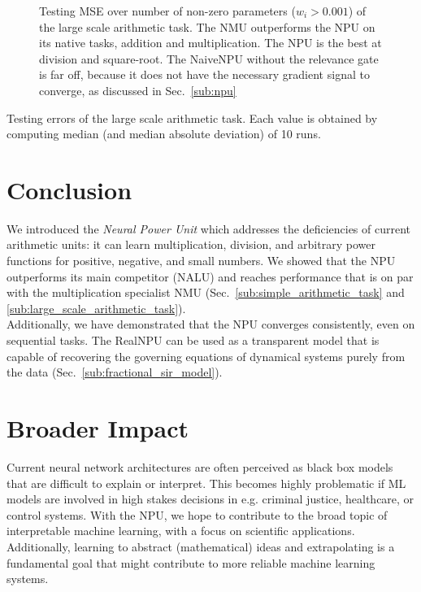 \documentclass[9pt]{article}
\begin{document}
\begin{figure}
  \centering
  \resizebox{\textwidth}{!}{}
  \caption{Testing MSE over number of non-zero parameters ($w_i > 0.001$) of the large scale
  arithmetic task. The NMU outperforms the NPU on its
  native tasks, addition and multiplication. The NPU is the best at division
  and square-root.  The NaiveNPU without the relevance gate is far off, because
  it does not have the necessary gradient signal to converge, as discussed in
  Sec.~\ref{sub:npu}}%
  \label{fig:pareto}
\end{figure}

\begin{table}
  \centering
  \caption{Testing errors of the large scale arithmetic task. Each value is
  obtained by computing median (and median absolute deviation) of 10 runs.}
  \label{tab:arithmetic100_val}
  \small
  
\end{table}

 
\section{Conclusion}%
\label{sec:conclusion}

We introduced the \emph{Neural Power Unit} which addresses the deficiencies
of current arithmetic units: it can learn multiplication, division, and arbitrary power functions for
positive, negative, and small numbers. We showed that the NPU outperforms its
main competitor (NALU) and reaches performance that is on par with the
multiplication specialist NMU (Sec.~\ref{sub:simple_arithmetic_task} and
\ref{sub:large_scale_arithmetic_task}).\\
Additionally, we have demonstrated that the NPU converges consistently, even on
sequential tasks. The RealNPU can be used as a transparent model that
is capable of recovering the governing equations of dynamical systems purely
from the data (Sec.~\ref{sub:fractional_sir_model}).

\section*{Broader Impact}%
\label{sec:statement_of_broader_impact}

Current neural network architectures are often perceived as black box models
that are difficult to explain or interpret. This becomes highly problematic if
ML models are involved in high stakes decisions in e.g. criminal justice,
healthcare, or control systems.  With the NPU, we hope to contribute to the
broad topic of interpretable machine learning, with a focus on scientific
applications.
Additionally, learning to abstract (mathematical) ideas and extrapolating is a
fundamental goal that might contribute to more reliable machine learning
systems.
\end{document}
